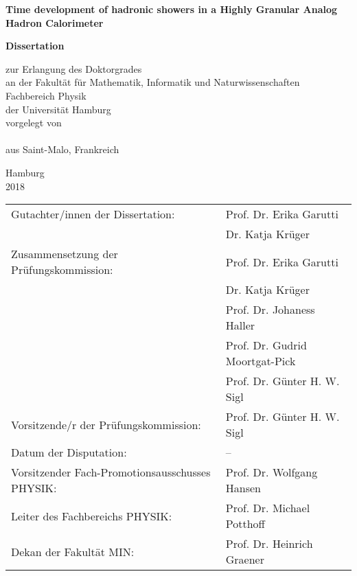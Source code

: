 \begin{titlepage}

  \thispagestyle{empty}
  \begin{center}

    {\huge \bf Time development of hadronic showers in a Highly Granular Analog Hadron Calorimeter\\}

    \vspace{3cm}

    {\LARGE \bf Dissertation\\}

    \vspace{0.5cm}
    {\Large
    zur Erlangung des Doktorgrades\\
    an der Fakult\"{a}t f\"ur Mathematik, Informatik und Naturwissenschaften\\
    Fachbereich Physik\\
    der Universit\"{a}t Hamburg\\
    \vspace{2.5cm}
    vorgelegt von\\
    \makeatletter
    \textsc{\@author}\\
    \makeatother
    aus Saint-Malo, Frankreich\\

    \vfill

    Hamburg\\
    2018\\
    }

    \newpage
    \thispagestyle{empty}
    \null
    \vfill
    \begin{tabular}{ll}
      Gutachter/innen der Dissertation: & Prof. Dr. Erika Garutti\\
      & Dr. Katja Kr\"uger\\[3mm]
      Zusammensetzung der Pr\"ufungskommission: & Prof. Dr. Erika Garutti\\
      & Dr. Katja Kr\"uger\\
      & Prof. Dr. Johaness Haller\\
      & Prof. Dr. Gudrid Moortgat-Pick\\
      & Prof. Dr. G\"unter H. W. Sigl\\[3mm]
      Vorsitzende/r der Pr\"ufungskommission: & Prof. Dr. G\"unter H. W. Sigl\\[3mm]
      Datum der Disputation: & --\\[3mm]
      Vorsitzender Fach-Promotionsausschusses PHYSIK: & Prof. Dr. Wolfgang Hansen\\[3mm]
      Leiter des Fachbereichs PHYSIK: & Prof. Dr. Michael Potthoff\\[3mm]
      Dekan der Fakult\"at MIN: & Prof. Dr. Heinrich Graener\\[3mm]
    \end{tabular}

  \end{center}
\end{titlepage}
